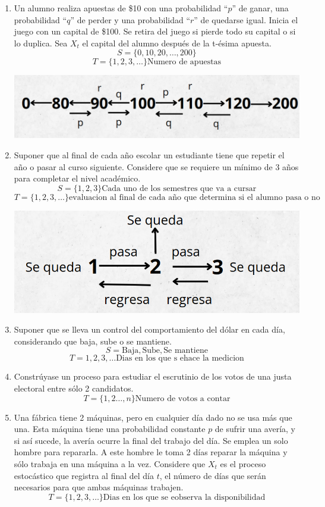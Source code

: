 \documentclass{article}
\begin{document}
\begin{enumerate}
    \item Un alumno realiza apuestas de \$10 con una probabilidad ``\( p \)'' de ganar, una probabilidad ``\( q \)'' de perder y una probabilidad ``\( r \)'' de quedarse igual. Inicia el juego con un capital de \$100. Se retira del juego si pierde todo su capital o si lo duplica. Sea \( X_t \) el capital del alumno después de la t-ésima apuesta.
          \[ S = \{0, 10, 20, \dots, 200\} \]
          \[ T = \{1,2,3,\dots\} \text{Numero de apuestas}\]
          \begin{center}
              \includegraphics[width=0.6\linewidth]{./imagenes/image.png}
          \end{center}
    \item Suponer que al final de cada año escolar un estudiante tiene que repetir el año o pasar al curso siguiente. Considere que se requiere un mínimo de 3 años para completar el nivel académico.
          \[ S = \{1,2,3\} \text{Cada uno de los semestres que va a cursar}\]
          \[T = \{1,2,3,\dots\}\text{evaluacion al final de cada año que determina si el alumno pasa o no}\]
          \begin{center}
              \includegraphics[width=0.6\linewidth]{./imagenes/image2.png}
          \end{center}
    \item Suponer que se lleva un control del comportamiento del dólar en cada día, considerando que baja, sube o se mantiene.
          \[S = {\text{Baja}, \text{Sube}, \text{Se mantiene}}\]
          \[T = {1,2,3,\dots} \text{Dias en los que s ehace la medicion}\]
    \item Constrúyase un proceso para estudiar el escrutinio de los votos de una justa electoral entre sólo 2 candidatos.
          \[T = \{1,2\dots, n\} \text{Numero de votos a contar}\]
    \item Una fábrica tiene 2 máquinas, pero en cualquier día dado no se usa más que una. Esta máquina tiene una probabilidad constante \( p \) de sufrir una avería, y si así sucede, la avería ocurre la final del trabajo del día. Se emplea un solo hombre para repararla. A este hombre le toma 2 días reparar la máquina y sólo trabaja en una máquina a la vez. Considere que \( X_t \) es el proceso estocástico que registra al final del día \( t \), el número de días que serán necesarios para que ambas máquinas trabajen.
          \[T = \{1,2,3,\dots\} \text{Dias en los que se eobserva la disponibilidad}\]
\end{enumerate}
\end{document}
